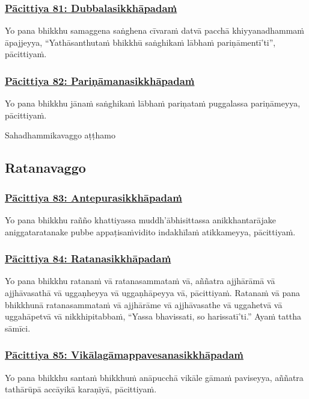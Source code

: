 \subsubsection*{\hyperref[exp81]{Pācittiya 81: Dubbalasikkhāpadaṁ}}
\label{pac81}
Yo pana bhikkhu samaggena saṅghena cīvaraṁ datvā pacchā khiyyanadhammaṁ āpajjeyya, ``Yathāsanthutaṁ bhikkhū saṅghikaṁ lābhaṁ pariṇāmentī'ti'', pācittiyaṁ.

\subsubsection*{\hyperref[exp82]{Pācittiya 82: Pariṇāmanasikkhāpadaṁ}}
\label{pac82}
Yo pana bhikkhu jānaṁ saṅghikaṁ lābhaṁ pariṇataṁ puggalassa pariṇāmeyya, pācittiyaṁ.

\begin{center}
  Sahadhammikavaggo aṭṭhamo
\end{center}

\subsection{Ratanavaggo}
\vspace{0.2cm}

\subsubsection*{\hyperref[exp83]{Pācittiya 83: Antepurasikkhāpadaṁ}}
\label{pac83}
Yo pana bhikkhu rañño khattiyassa muddh'ābhisittassa anikkhantarājake aniggataratanake pubbe appaṭisaṁvidito indakhīlaṁ atikkameyya, pācittiyaṁ.

\subsubsection*{\hyperref[exp84]{Pācittiya 84: Ratanasikkhāpadaṁ}}
\label{pac84}
Yo pana bhikkhu ratanaṁ vā ratanasammataṁ vā, aññatra ajjhārāmā vā ajjhāvasathā vā uggaṇheyya vā uggaṇhāpeyya vā, pācittiyaṁ. Ratanaṁ vā pana bhikkhunā ratanasammataṁ vā ajjhārāme vā ajjhāvasathe vā uggahetvā vā uggahāpetvā vā nikkhipitabbaṁ, ``Yassa bhavissati, so harissatī'ti.'' Ayaṁ tattha sāmīci.

\subsubsection*{\hyperref[exp85]{Pācittiya 85: Vikālagāmappavesanasikkhāpadaṁ}}
\label{pac85}
Yo pana bhikkhu santaṁ bhikkhuṁ anāpucchā vikāle gāmaṁ paviseyya, aññatra tathārūpā accāyikā karaṇīyā, pācittiyaṁ.

